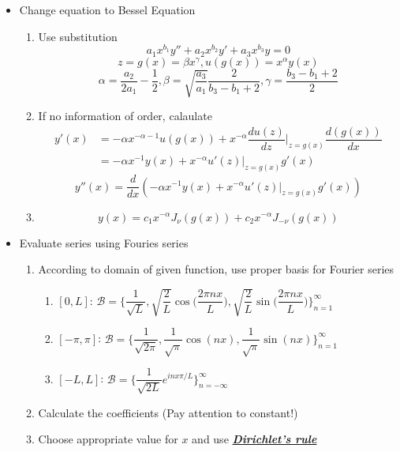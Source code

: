 \documentclass{beamer}
\begin{document}
\begin{frame}
\begin{itemize}
\item Change equation to Bessel Equation
\begin{enumerate}
\item Use substitution
$$a_1x^{b_1}y''+a_2x^{b_2}y'+a_3x^{b_3}y=0$$
$$z=g(x)=\beta x^{\gamma},u(g(x))=x^{\alpha}y(x)$$
$$\alpha=\dfrac{a_2}{2a_1}-\dfrac{1}{2},\beta=\sqrt{\dfrac{a_3}{a_1}}\dfrac{2}{b_3-b_1+2}, \gamma=\dfrac{b_3-b_1+2}{2}$$
\item If no information of order, calaulate
\begin{align*}
y'(x)&=-\alpha x^{-\alpha-1}u(g(x))+x^{-\alpha}\dfrac{du(z)}{dz}\Bigg|_{z=g(x)}\dfrac{d(g(x))}{dx}\\
&=-\alpha x^{-1}y(x)+x^{-\alpha}u'(z)|_{z=g(x)}g'(x)
\end{align*}
$$y''(x)=\dfrac{d}{dx}(-\alpha x^{-1}y(x)+x^{-\alpha}u'(z)|_{z=g(x)}g'(x))$$
\item  $$y(x)=c_1x^{-\alpha}J_{\nu}(g(x))+c_2x^{-\alpha}J_{-\nu}(g(x))$$
\end{enumerate}

\end{itemize}
\end{frame}

\begin{frame}
\begin{itemize}
\item Evaluate series using Fouries series
\begin{enumerate}
\item According to domain of given function, use proper basis for Fourier series
\begin{enumerate}
\item $[0,L]$: $\mathcal{B}=\Big\lbrace \dfrac{1}{\sqrt{L}},\sqrt{\dfrac{2}{L}}\cos\Big(\dfrac{2\pi nx}{L}\Big),\sqrt{\dfrac{2}{L}}\sin\Big(\dfrac{2\pi nx}{L}\Big)\Big\rbrace_{n=1}^{\infty}$
\item $[-\pi,\pi]$: $\mathcal{B}=\Big\lbrace \dfrac{1}{\sqrt{2\pi}},\dfrac{1}{\sqrt{\pi}}\cos(nx),\dfrac{1}{\sqrt{\pi}}\sin(nx)\Big\rbrace_{n=1}^{\infty}$
\item $[-L,L]$: $\mathcal{B}=\Big\lbrace \dfrac{1}{\sqrt{2L}}e^{inx\pi/L}\Big\rbrace_{n=-\infty}^{\infty}$
\end{enumerate}
\item Calculate the coefficients (Pay attention to constant!)
\item Choose appropriate value for $x$ and use \underline{\textbf{\textit{\emph{Dirichlet's rule}}}} 
\end{enumerate}
\end{itemize}
\end{frame}
\end{document}
